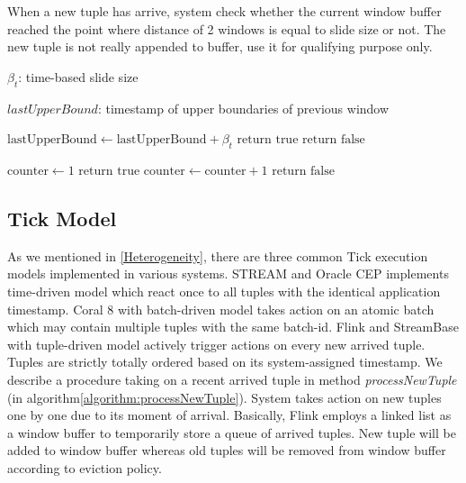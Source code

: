 \begin{algorithm}
\caption{Whether system should trigger a new window }
\label{algorithm:notifyTrigger}
When a new tuple has arrive, system check whether the current window buffer reached the point where distance of 2 windows is equal to slide size or not. The new tuple is not really appended to buffer, use it for qualifying purpose only.

\algrenewcommand{}
\begin{algorithmic}[1]
  	
  			{$\beta_t$: time-based slide size }

  			{$lastUpperBound$: timestamp of upper boundaries of previous window}
    
   
    
    			\State $\textrm{lastUpperBound} \gets \textrm{lastUpperBound} + \beta_t$
    			\State $\textrm{return true}$
    		\Else
    			\State$\textrm{return false}$
    		\EndIf
    
    \Else {}
    			\State $\textrm{counter} \gets 1$
    			\State $\textrm{return true}$
    		\Else
    			\State $\textrm{counter} \gets \textrm{counter} + 1$
    			\State $\textrm{return false}$
    		\EndIf
    	\EndIf
    
    
    \EndProcedure
  \end{algorithmic}
\end{algorithm}


\subsection{Tick Model}
As we mentioned in \ref{Heterogeneity}, there are three common Tick execution models\citep{Dindar:2013} implemented in various systems. STREAM and Oracle CEP implements time-driven model which react once to all tuples with the identical application timestamp. Coral 8 with batch-driven model takes action on an atomic batch which may contain multiple tuples with the same batch-id. Flink and StreamBase with tuple-driven model actively trigger actions on every new arrived tuple. Tuples are strictly totally ordered based on its system-assigned timestamp. We describe a procedure taking on a recent arrived tuple in method \textit{processNewTuple}  (in algorithm\ref{algorithm:processNewTuple}). 
System takes action on new tuples one by one due to its moment of arrival. 
Basically, Flink employs a linked list as a window buffer to temporarily store a queue of arrived tuples. New tuple will be added to window buffer whereas old tuples will be removed from window buffer according to eviction policy.

